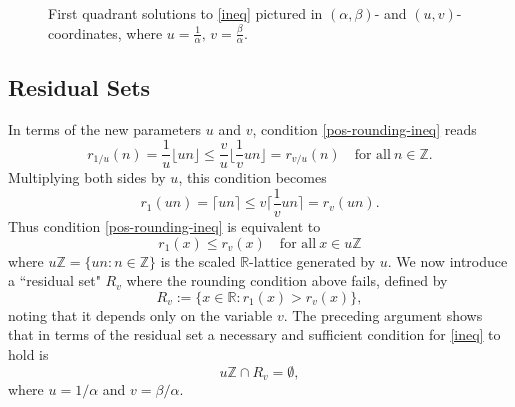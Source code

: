 \documentclass[12pt,letterpaper, reqno]{amsart}
\theoremstyle{definition}
\theoremstyle{remark}
\newcommand{\RR}{\ensuremath{\mathbb{R}}}
\newcommand{\ZZ}{\ensuremath{\mathbb{Z}}}
\newcommand{\R}{{R}}
\newcommand{\floor}[1]{\lfloor{#1}\rfloor}
\newcommand{\ceil}[1]{\lceil{#1}\rceil}
\begin{document}
\begin{figure}[h]
\begin{center}
\end{center}
\caption{First quadrant solutions to \eqref{ineq} pictured in $(\alpha,\beta)$- and $(u,v)$-coordinates,
where $u = \frac{1}{\alpha}, \, v= \frac{\beta}{\alpha}$.}\label{fig4}
\end{figure} 


%
%
\subsection{Residual Sets}\label{sec:41}

In terms of the new  parameters $u$ and $v $, 
condition \eqref{pos-rounding-ineq} reads
\[ r_{1/u}(n) = \frac1u\floor{u n}\leq \frac{v}{u}\floor{\frac{1}{v} un}=r_{v/u}(n)
\quad\text{for all}\ n\in \ZZ.
\]
Multiplying both sides by ${u}$, this condition becomes 
\[ r_1(un) = \ceil{un} \leq v\ceil{\frac{1}{v}un} = r_v(un).\]
Thus condition \eqref{pos-rounding-ineq} is equivalent to 
\begin{equation}\label{uv-rounding-pos}
r_1(x)  \leq  r_v(x) \quad\text{for all}\ x\in u\ZZ
\end{equation}
where $u\ZZ = \{un : n\in\ZZ\}$ is the scaled $\RR$-lattice generated by $u$.
We now introduce a ``residual set" $\R_v$ where the rounding condition above fails, defined by
\[ 
\R_v := \{ x\in \RR : r_1(x) > r_v(x)\},
\]
noting that it depends only on the variable $v$.
The  preceding argument shows that in terms of the residual set
 a necessary and sufficient condition for \eqref{ineq} to hold is
\begin{equation}\label{u-v-1} 
u\ZZ \cap \R_v = \emptyset,
\end{equation}
where $u = 1/\alpha$ and $v = \beta/\alpha$.
\end{document}
